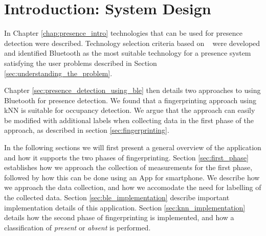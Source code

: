 \section{Introduction: System Design}
In Chapter \ref{chap:presence_intro} technologies that can be used for presence detection were described. 
Technology selection criteria based on \citeauthor{presence_ble_review}~\cite{presence_ble_review} were developed and identified Bluetooth as the most suitable technology for a presence system satisfying the user problems described in Section \ref{sec:understanding_the_problem}.

Chapter \ref{sec:presence_detection_using_ble} then details two approaches to using Bluetooth for presence detection. 
We found that a fingerprinting approach using kNN is suitable for occupancy detection. 
We argue that the approach can easily be modified with additional labels when collecting data in the first phase of the approach, as described in section \ref{sec:fingerprinting}.

In the following sections we will first present a general overview of the application and how it supports the two phases of fingerprinting. 
Section \ref{sec:first_phase} establishes how we approach the collection of measurements for the first phase, followed by how this can be done using an App for smartphone. 
We describe how we approach the data collection, and how we accomodate the need for labelling of the collected data.
Section \ref{sec:ble_implementation} describe important implementation details of this application. 
Section \ref{sec:knn_implementation} details how the second phase of fingerprinting is implemented, and how a classification of \textit{present} or \textit{absent} is performed.



